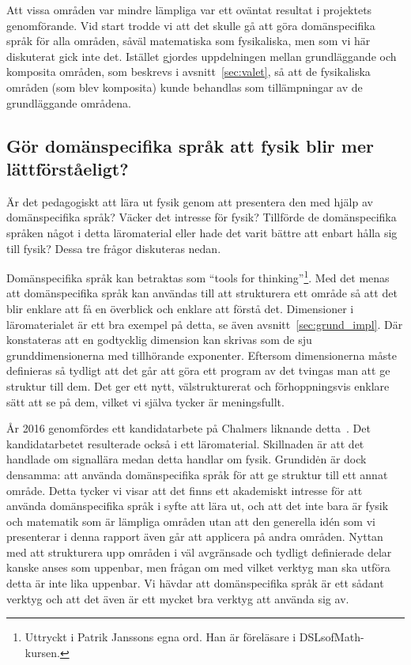 Att vissa områden var mindre lämpliga var ett oväntat resultat i projektets
genomförande. Vid start trodde vi att det skulle gå att göra domänspecifika
språk för alla områden, såväl matematiska som fysikaliska, men som vi här
diskuterat gick inte det. Istället gjordes uppdelningen mellan grundläggande och
komposita områden, som beskrevs i avsnitt~\ref{sec:valet}, så att de fysikaliska
områden (som blev komposita) kunde behandlas som tillämpningar av de
grundläggande områdena.

\subsection{Gör domänspecifika språk att fysik blir mer lättförståeligt?}\label{sec:bara_fysik}

Är det pedagogiskt att lära ut fysik genom att presentera den med hjälp av
domänspecifika språk? Väcker det intresse för fysik? Tillförde de domänspecifika
språken något i detta läromaterial eller hade det varit bättre att enbart hålla
sig till fysik? Dessa tre frågor diskuteras nedan.

Domänspecifika språk kan betraktas som ``tools for thinking''\footnote{Uttryckt i Patrik Janssons egna ord. Han är föreläsare i DSLsofMath-kursen.}. Med det menas att domänspecifika språk kan användas
till att strukturera ett område så att det blir enklare att få en överblick och
enklare att förstå det. Dimensioner i läromaterialet är ett bra exempel på
detta, se även avsnitt~\ref{sec:grund_impl}. Där konstateras att en godtycklig
dimension kan skrivas som de sju grunddimensionerna med tillhörande exponenter.
Eftersom dimensionerna måste definieras så tydligt att det går att göra ett
program av det tvingas man att ge struktur till dem. Det ger ett nytt,
välstrukturerat och förhoppningsvis enklare sätt att se på dem, vilket vi själva
tycker är meningsfullt.

År 2016 genomfördes ett kandidatarbete på Chalmers liknande
detta~\cite{kandidat2016}. Det kandidatarbetet resulterade också i ett
läromaterial. Skillnaden är att det handlade om signallära medan detta handlar
om fysik. Grundidėn är dock densamma: att använda domänspecifika språk för att
ge struktur till ett annat område.  Detta tycker vi visar att det finns ett
akademiskt intresse för att använda domänspecifika språk i syfte att lära ut,
och att det inte bara är fysik och matematik som är lämpliga områden utan att
den generella idén som vi presenterar i denna rapport även går att applicera på
andra områden. Nyttan med att strukturera upp områden i väl avgränsade och
tydligt definierade delar kanske anses som uppenbar, men frågan om med vilket
verktyg man ska utföra detta är inte lika uppenbar. Vi hävdar att domänspecifika
språk är ett sådant verktyg och att det även är ett mycket bra verktyg att
använda sig av.

